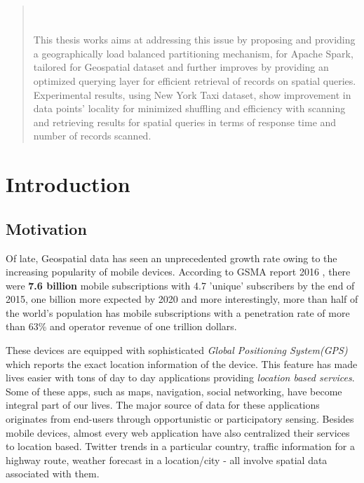 \documentclass[article,type=msc,colorback,12pt,accentcolor=tud1d]{tudthesis}
\begin{document}
\begin{abstract}
		 \\ \\
		  This thesis works aims at addressing this issue by proposing and providing a geographically load balanced partitioning mechanism, for Apache Spark, tailored for Geospatial dataset and further improves by providing an optimized querying layer for efficient retrieval of records on spatial queries. Experimental results, using New York Taxi dataset, show  improvement in data points' locality for minimized shuffling and efficiency with scanning and retrieving results for spatial queries in terms of response time and number of records scanned.\cite{sparkbook}
		

\end{abstract}  

\clearpage



\setlength{ \parskip }{1em}
\tableofcontents 
\cleardoublepage 

\listoffigures
\clearpage
\appendix
\cleardoublepage 

	\hfill
	
  \section{Introduction}
  \hfill \break
 
		\subsection{Motivation}
		
		\par Of late, Geospatial data has seen an unprecedented growth rate owing to the increasing popularity of mobile devices. According to GSMA report 2016 \cite{GSMA_REPORT_2016}, there were \textbf{7.6 billion} mobile subscriptions with 4.7 'unique' subscribers by the end of 2015, one billion more expected by 2020 and more interestingly, more than half of the world's population has mobile subscriptions with a penetration rate of more than 63\% and operator revenue of one trillion dollars.
		
		These devices are equipped with sophisticated \textit{Global Positioning System(GPS)} which reports the exact location information of the device. This feature has made lives easier with tons of day to day applications providing \textit{location based services}. Some of these apps, such as maps, navigation, social networking, have become integral part of our lives. The major source of data for these applications originates from end-users through opportunistic or participatory sensing. Besides mobile devices, almost every web application have also centralized their services to location based. Twitter trends in a particular country, traffic information for a highway route, weather forecast in a location/city - all involve spatial data associated with them. 
		
\end{document}
